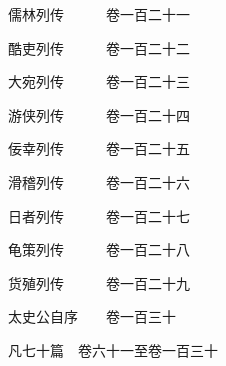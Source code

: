 \par\hspace{3.5em}儒林列传　　　\hspace{1.5em}卷一百二十一
\par\hspace{3.5em}酷吏列传　　　\hspace{1.5em}卷一百二十二
\par\hspace{3.5em}大宛列传　　　\hspace{1.5em}卷一百二十三
\par\hspace{3.5em}游侠列传　　　\hspace{1.5em}卷一百二十四
\par\hspace{3.5em}佞幸列传　　　\hspace{1.5em}卷一百二十五
\par\hspace{3.5em}滑稽列传　　　\hspace{1.5em}卷一百二十六
\par\hspace{3.5em}日者列传　　　\hspace{1.5em}卷一百二十七
\par\hspace{3.5em}龟策列传　　　\hspace{1.5em}卷一百二十八
\par\hspace{3.5em}货殖列传　　　\hspace{1.5em}卷一百二十九
\par\hspace{3.5em}太史公自序　　\hspace{1.5em}卷一百三十
\par\hspace{3.5em}凡七十篇　卷六十一至卷一百三十
